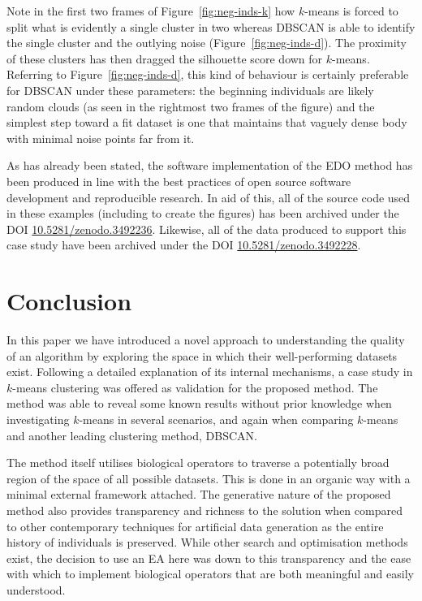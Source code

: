 Note in the first two frames of Figure~\ref{fig:neg-inds-k} how \(k\)-means is
forced to split what is evidently a single cluster in two whereas DBSCAN is able
to identify the single cluster and the outlying noise
(Figure~\ref{fig:neg-inds-d}). The proximity of these clusters has then dragged
the silhouette score down for \(k\)-means. Referring to
Figure~\ref{fig:neg-inds-d}, this kind of behaviour is certainly preferable for
DBSCAN under these parameters: the beginning individuals are likely random
clouds (as seen in the rightmost two frames of the figure) and the simplest step
toward a fit dataset is one that maintains that vaguely dense body with minimal
noise points far from it.

As has already been stated, the software implementation of the EDO method
has been produced in line with the best practices of open source software
development and reproducible research. In aid of this, all of the source code
used in these examples (including to create the figures) has been archived
under the DOI
\href{https://doi.org/10.5281/zenodo.3492236}{10.5281/zenodo.3492236}.
Likewise, all of the data produced to support this case study have been archived
under the DOI
\href{https://doi.org/10.5281/zenodo.3492228}{10.5281/zenodo.3492228}.


\section{Conclusion}

In this paper we have introduced a novel approach to understanding the quality
of an algorithm by exploring the space in which their well-performing datasets
exist. Following a detailed explanation of its internal mechanisms, a case study
in \(k\)-means clustering was offered as validation for the proposed method.
The method was able to reveal some known results without prior knowledge when
investigating \(k\)-means in several scenarios, and again when comparing
\(k\)-means and another leading clustering method, DBSCAN.\

The method itself utilises biological operators to traverse a potentially broad
region of the space of all possible datasets. This is done in an organic way
with a minimal external framework attached. The generative nature of the
proposed method also provides transparency and richness to the solution when
compared to other contemporary techniques for artificial data generation as the
entire history of individuals is preserved. While other search and optimisation
methods exist, the decision to use an EA here was down to this transparency and
the ease with which to implement biological operators that are both meaningful
and easily understood.

